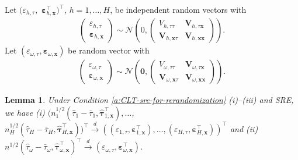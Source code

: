 \documentclass[12pt]{article}
\newtheorem{lemma}{Lemma}
\newcommand{\wconv}{\stackrel{d}{\rightarrow}}
\newcommand{\bs}{\boldsymbol}
\begin{document}
Let $(\varepsilon_{h,\tau},$ $\bs{\varepsilon}_{h,\bs{x}}^\top)^\top$, $h=1,\ldots,H$, be independent random vectors with  \begin{align*}
    \begin{pmatrix}
      \varepsilon_{h,\tau} \\
      \bs{\varepsilon}_{h,\bs{x}}
    \end{pmatrix} \sim \mathcal{N}\left(0,\begin{pmatrix}
      V_{h,\tau\tau} & \bs{V}_{h,\tau\bs{x}}\\
      \bs{V}_{h,\bs{x}\tau} & \bs{V}_{h,\bs{x}\bs{x}}
      \end{pmatrix}\right).
  \end{align*}
Let $(\varepsilon_{\omega,\tau},
      \bs{\varepsilon}_{\omega,\bs{x}})$ be random vector with
\begin{align*}
    \begin{pmatrix}
      \varepsilon_{\omega,\tau} \\
      \bs{\varepsilon}_{\omega,\bs{x}}
    \end{pmatrix} \sim \mathcal{N}\left(\bs{0},\begin{pmatrix}
      V_{\omega, \tau\tau} & \bs{V}_{\omega, \tau\bs{x}}\\
      \bs{V}_{\omega,\bs{x}\tau} & \bs{V}_{\omega,\bs{x}\bs{x}}
      \end{pmatrix}\right).
  \end{align*}

\begin{lemma}
\label{lem:CLT-for-rerandomization}
    Under Condition \ref{a:CLT-sre-for-rerandomization} (i)--(iii) and SRE, we have (i)
  $(n_1^{1/2}(\hat{\tau}_1-\bar{\tau}_1, \hat{\bs{\tau}}_{1,\bs{x}}^\top),\ldots$, $n_H^{1/2}(\hat{\tau}_H-\bar{\tau}_H, \hat{\bs{\tau}}_{H,\bs{x}}^\top))^\top \wconv ((\varepsilon_{1,\tau},\bs{\varepsilon}_{1,\bs{x}}^\top),\ldots, (\varepsilon_{H,\tau},\bs{\varepsilon}_{H,\bs{x}}^\top))^\top $ and
 (ii) $n^{1/2}(\hat{\tau}_{\omega} - \bar{\tau}_{\omega}, \hat{\bs{\tau}}_{\omega,\bs{x}}^\top)^\top \wconv (\varepsilon_{\omega,\tau},\bs{\varepsilon}_{\omega,\bs{x}}^\top) $.
\end{lemma}
\end{document}
